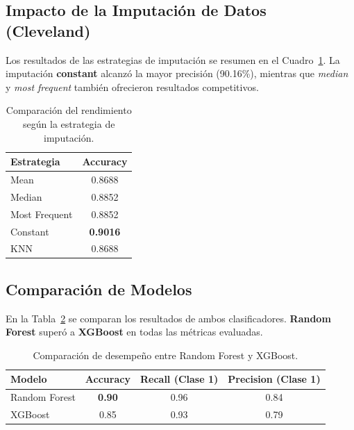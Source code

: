 \documentclass[12pt]{article}
\begin{document}
\subsection{Impacto de la Imputación de Datos (Cleveland)}
Los resultados de las estrategias de imputación se resumen en el Cuadro~\ref{tab:imputacion}.  
La imputación \textbf{constant} alcanzó la mayor precisión (90.16\%), mientras que \textit{median} y \textit{most frequent} también ofrecieron resultados competitivos.

\begin{table}[H]
\centering
\begin{tabular}{l c}
\toprule
\textbf{Estrategia} & \textbf{Accuracy} \\
\midrule
Mean & 0.8688 \\
Median & 0.8852 \\
Most Frequent & 0.8852 \\
Constant & \textbf{0.9016} \\
KNN & 0.8688 \\
\bottomrule
\end{tabular}
\caption{Comparación del rendimiento según la estrategia de imputación.}
\label{tab:imputacion}
\end{table}

\subsection{Comparación de Modelos}
En la Tabla~\ref{tab:modelos} se comparan los resultados de ambos clasificadores.  
\textbf{Random Forest} superó a \textbf{XGBoost} en todas las métricas evaluadas.

\begin{table}[H]
\centering
\begin{tabular}{l c c c}
\toprule
\textbf{Modelo} & \textbf{Accuracy} & \textbf{Recall (Clase 1)} & \textbf{Precision (Clase 1)} \\
\midrule
Random Forest & \textbf{0.90} & 0.96 & 0.84 \\
XGBoost & 0.85 & 0.93 & 0.79 \\
\bottomrule
\end{tabular}
\caption{Comparación de desempeño entre Random Forest y XGBoost.}
\label{tab:modelos}
\end{table}
\end{document}
